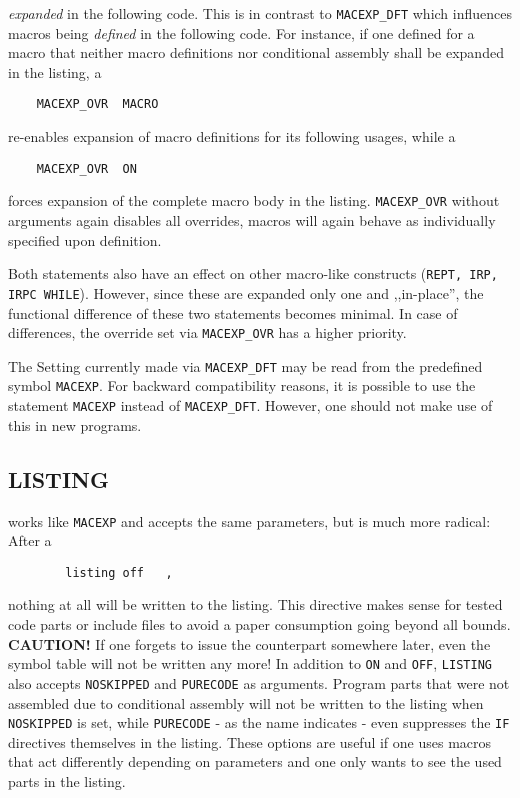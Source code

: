 \documentclass[12pt,twoside]{report}
\makeatletter
\newcommand{\bb}[1]{{\bf #1}}
\newcommand{\tty}[1]{{\tt #1}}
\newcommand{\ttindex}[1]{\index{#1@{\tt #1}}}
\makeatother
\begin{document}
{\em expanded} in the following code.  This is in contrast to
\tty{MACEXP\_DFT} which influences macros being {\em defined} in the
following code.  For instance, if one defined for a macro that
neither macro definitions nor conditional assembly shall be expanded
in the listing, a
\begin{verbatim}
	MACEXP_OVR  MACRO
\end{verbatim}
re-enables expansion of macro definitions for its following usages,
while a
\begin{verbatim}
	MACEXP_OVR  ON
\end{verbatim}
forces expansion of the complete macro body in the listing.
\tty{MACEXP\_OVR} without arguments again disables all overrides,
macros will again behave as individually specified upon definition.
\par
Both statements also have an effect on other macro-like constructs
(\tty{REPT, IRP, IRPC WHILE}).  However, since these are expanded
only one and ,,in-place'', the functional difference of these two
statements becomes minimal.  In case of differences, the override set
via \tty{MACEXP\_OVR} has a higher priority.

The Setting currently made via \tty{MACEXP\_DFT} may be read from the
predefined symbol \tty{MACEXP}.  For backward compatibility reasons,
it is possible to use the statement \tty{MACEXP} instead of
\tty{MACEXP\_DFT}.  However, one should not make use of this in new
programs.


\subsection{LISTING}
\ttindex{LISTING}

works like \tty{MACEXP} and accepts the same parameters, but is much more
radical: After a
\begin{verbatim}
        listing off   ,
\end{verbatim}
nothing at all will be written to the listing.  This directive makes sense
for tested code parts or include files to avoid a paper consumption going
beyond all bounds.  \bb{CAUTION!} If one forgets to issue the counterpart
somewhere later, even the symbol table will not be written any more!  In
addition to \tty{ON} and \tty{OFF}, \tty{LISTING} also accepts
\tty{NOSKIPPED} and \tty{PURECODE} as arguments.  Program parts that were
not assembled due to conditional assembly will not be written to the
listing when \tty{NOSKIPPED} is set, while \tty{PURECODE} - as the name
indicates - even suppresses the \tty{IF} directives themselves in the
listing.  These options are useful if one uses macros that act differently
depending on parameters and one only wants to see the used parts in the
listing.
\end{document}

